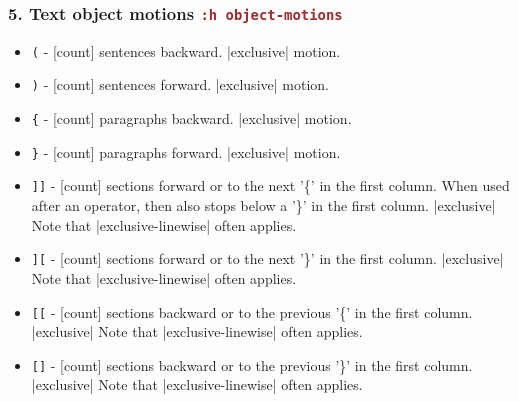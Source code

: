 \documentclass{beamer}
\newcommand{\vimcommand}[1]{\texttt{\textcolor{brown}{#1}}}
\newcommand{\vimhelp}[1]{\vimcommand{:h #1}}
\begin{document}
\begin{frame}
    \frametitle{5. Text object motions \vimhelp{object-motions}}
    \begin{itemize}
        \item \texttt{(}  - [count] sentences backward.  |exclusive| motion.
        \item \texttt{)}  - [count] sentences forward.  |exclusive| motion.
        \item \texttt{\{} - [count] paragraphs backward.  |exclusive| motion.
        \item \texttt{\}} - [count] paragraphs forward.  |exclusive| motion.
        \item \texttt{]]} - [count] sections forward or to the next '\{' in the   first column.  When used after an operator, then also stops below a '\}' in the first column.  |exclusive| Note that |exclusive-linewise| often applies.
        \item \texttt{][} - [count] sections forward or to the next '\}' in the first column.  |exclusive| Note that |exclusive-linewise| often applies. 
        \item \texttt{[[} - [count] sections backward or to the previous '\{' in       the first column.  |exclusive|       Note that |exclusive-linewise| often applies.
        \item \texttt{[]} - [count] sections backward or to the previous '\}' in    the first column.  |exclusive|     Note that |exclusive-linewise| often applies.
    \end{itemize}
\end{frame}
\end{document}
